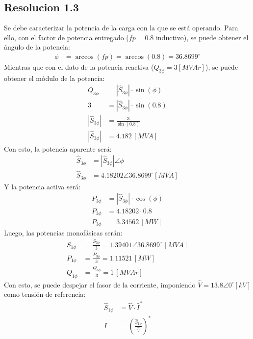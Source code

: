\documentclass[
  11pt,
  letterpaper,
   addpoints,
   answers
  ]{exam}
\begin{document}
\begin{questions}
\begin{solution}
        \subsection*{Resolucion 1.3}
        Se debe caracterizar la potencia de la carga con la que se está operando. Para ello, con el factor de potencia entregado (\( fp = 0.8 \) inductivo), se puede obtener el ángulo de la potencia:
        \begin{align}
            \phi &= \arccos(fp) = \arccos(0.8) = 36.8699^\circ
        \end{align}
        Mientras que con el dato de la potencia reactiva (\( Q_{3\phi} = 3 [MVAr] \)), se puede obtener el módulo de la potencia:
        \begin{align}
         Q_{3\phi} &= |\hat{S}_{3\phi}| \cdot \sin(\phi) \\
            3 &= |\hat{S}_{3\phi}| \cdot \sin(0.8) \\
        |\hat{S}_{3\phi}| &= \frac{3}{\sin(0.8)} \\
        |\hat{S}_{3\phi}| &= 4.182 \, [MVA]
    \end{align}
    Con esto, la potencia aparente será:
    \begin{align}
        \hat{S}_{3\phi} &= |\hat{S}_{3\phi}| \angle \phi \\
        \hat{S}_{3\phi} &= 4.18202 \angle 36.8699^\circ [MVA]
    \end{align}
    Y la potencia activa será:
    \begin{align}
        P_{3\phi} &= |\hat{S}_{3\phi}| \cdot \cos(\phi) \\
        P_{3\phi} &= 4.18202 \cdot 0.8 \\
        P_{3\phi} &= 3.34562 \, [MW]
    \end{align}
    Luego, las potencias monofásicas serán:
    \begin{align}
        S_{1\phi} &= \frac{S_{3\phi}}{3} = 1.39401 \angle 36.8699^\circ \, [MVA] \\
        P_{1\phi} &= \frac{P_{3\phi}}{3} = 1.11521 \, [MW] \\
        Q_{1\phi} &= \frac{Q_{3\phi}}{3} = 1 \, [MVAr]
    \end{align}
    Con esto, se puede despejar el fasor de la corriente, imponiendo \( \hat{V} = 13.8 \angle 0^\circ [kV] \) como tensión de referencia:
    \begin{align}
        \hat{S}_{1\phi} &= \hat{V} \cdot \hat{I}^* \\
        I &= \left( \frac{\hat{S}_{1\phi}}{\hat{V}} \right)^* \\

\end{align}
\end{solution}
\end{questions}
\end{document}
